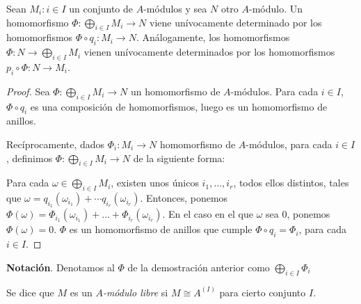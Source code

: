 \documentclass[../main.tex]{subfiles}
\begin{document}
\begin{lemma} Sean ${M_i:i\in I}$ un conjunto de $A$-módulos y sea $N$ otro $A$-módulo. Un homomorfismo $\Phi:\bigoplus_{i\in I} M_i \rightarrow N$ viene unívocamente determinado por los homomorfismos $\Phi \circ q_i:M_i \rightarrow N$. Análogamente, los homomorfismos $\Phi:N\rightarrow \bigoplus_{i\in I} M_i$ vienen unívocamente determinados por los homomorfismos $p_i\circ \Phi:N\rightarrow M_i$.
\end{lemma}

\begin{proof}
Sea $\Phi:\bigoplus_{i\in I} M_i \rightarrow N$ un homomorfismo de $A$-módulos. Para cada $i\in I$, $\Phi \circ q_i$ es una composición de homomorfismos, luego es un homomorfismo de anillos.

Recíprocamente, dados $\Phi_i:M_i\rightarrow N$ homomorfismo de $A$-módulos, para cada $i\in I$, definimos $\Phi:\bigoplus_{i\in I} M_i\rightarrow N$ de la siguiente forma:

Para cada $\omega \in \bigoplus_{i\in I} M_i$, existen unos únicos $i_1,...,i_r$, todos ellos distintos, tales que $\omega=q_{i_1}(\omega_{i_1})+\cdots q_{i_r}(\omega_{i_r})$. Entonces, ponemos $\Phi(\omega)=\Phi_{i_1}(\omega_{i_1})+...+\Phi_{i_r}(\omega_{i_r})$. En el caso en el que $\omega$ sea $0$, ponemos $\Phi(\omega)=0$. $\Phi$ es un homomorfismo de anillos que cumple $\Phi\circ q_i = \Phi_i$, para cada $i\in I$.
\end{proof}

\textbf{Notación}. Denotamos al $\Phi$ de la demostración anterior como $\bigoplus_{i\in I} \Phi_i$

\begin{definition}
  Se dice que $M$ es un \textit{$A$-módulo libre} si $M \cong A^{(I)}$ para cierto conjunto $I$.
\end{definition}
\end{document}
